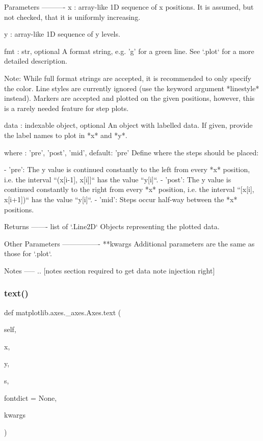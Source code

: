 \begin{DoxyVerb}
\begin{DoxyVerb}
Parameters
----------
x : array-like
    1D sequence of x positions. It is assumed, but not checked, that
    it is uniformly increasing.

y : array-like
    1D sequence of y levels.

fmt : str, optional
    A format string, e.g. 'g' for a green line. See `.plot` for a more
    detailed description.

    Note: While full format strings are accepted, it is recommended to
    only specify the color. Line styles are currently ignored (use
    the keyword argument *linestyle* instead). Markers are accepted
    and plotted on the given positions, however, this is a rarely
    needed feature for step plots.

data : indexable object, optional
    An object with labelled data. If given, provide the label names to
    plot in *x* and *y*.

where : {'pre', 'post', 'mid'}, default: 'pre'
    Define where the steps should be placed:

    - 'pre': The y value is continued constantly to the left from
      every *x* position, i.e. the interval ``(x[i-1], x[i]]`` has the
      value ``y[i]``.
    - 'post': The y value is continued constantly to the right from
      every *x* position, i.e. the interval ``[x[i], x[i+1])`` has the
      value ``y[i]``.
    - 'mid': Steps occur half-way between the *x* positions.

Returns
-------
list of `.Line2D`
    Objects representing the plotted data.

Other Parameters
----------------
**kwargs
    Additional parameters are the same as those for `.plot`.

Notes
-----
.. [notes section required to get data note injection right]
\end{DoxyVerb}
 \mbox{\label{classmatplotlib_1_1axes_1_1__axes_1_1Axes_a73ed6fed1fd809148b1fb6936b993dbe}} 
\subsubsection{\texorpdfstring{text()}{text()}}
{\footnotesize\ttfamily def matplotlib.\+axes.\+\_\+axes.\+Axes.\+text (\begin{DoxyParamCaption}\item[{}]{self,  }\item[{}]{x,  }\item[{}]{y,  }\item[{}]{s,  }\item[{}]{fontdict = {\ttfamily None},  }\item[{}]{kwargs }\end{DoxyParamCaption})}


\end{DoxyVerb}
